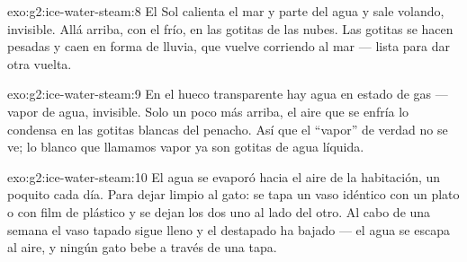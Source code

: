 \begin{solution}{exo:g2:ice-water-steam:8}
El Sol calienta el mar y parte del agua  y sale volando,
invisible. Allá arriba, con el frío,  en las gotitas de
las nubes. Las gotitas se hacen pesadas y caen en forma de lluvia, que
vuelve corriendo al mar --- lista para dar otra vuelta.
\end{solution}

\begin{solution}{exo:g2:ice-water-steam:9}
En el hueco transparente hay agua en estado de gas --- vapor de agua,
invisible. Solo un poco más arriba, el aire que se enfría lo
condensa en las gotitas blancas del penacho. Así que el ``vapor'' de
verdad no se ve; lo blanco que llamamos vapor ya son gotitas de agua
líquida.
\end{solution}

\begin{solution}{exo:g2:ice-water-steam:10}
El agua se evaporó hacia el aire de la habitación, un poquito cada
día. Para dejar limpio al gato: se tapa un vaso idéntico con un plato
o con film de plástico y se dejan los dos uno al lado del otro. Al
cabo de una semana el vaso tapado sigue lleno y el destapado ha bajado
--- el agua se escapa al aire, y ningún gato bebe a través de una
tapa.
\end{solution}
